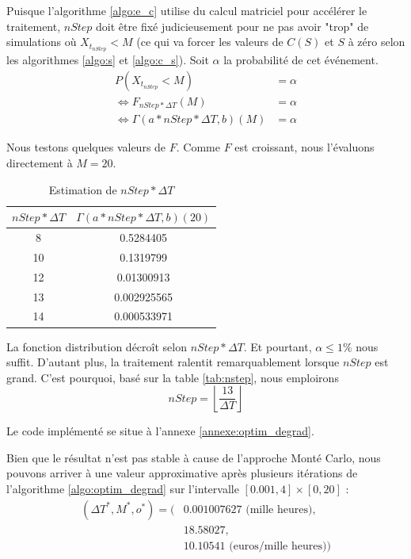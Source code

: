 \documentclass[10pt,a4paper]{article}
\begin{document}
\FloatBarrier
Puisque l'algorithme \eqref{algo:e_c} utilise du calcul matriciel pour accélérer le traitement, $nStep$ doit être fixé judicieusement pour ne pas avoir "trop" de simulations où $X_{t_{nStep}} < M$ (ce qui va forcer les valeurs de $C(S)$ et $S$ à zéro selon les algorithmes \eqref{algo:s} et \eqref{algo:c_s}). Soit $\alpha$ la probabilité de cet événement.
\begin{align*}
    P\left( {{X_{{t_{nStep}}}} < M} \right) & = \alpha  \\
    \Leftrightarrow {F_{nStep*\Delta T}}\left( M \right) & = \alpha \\
    \Leftrightarrow \Gamma \left( {a*nStep*\Delta T,b} \right)\left( M \right) & = \alpha 
\end{align*}

Nous testons quelques valeurs de $F$. Comme $F$ est croissant, nous l'évaluons directement à $M=20$.

\begin{table}[!h]
    \centering
    \begin{tabular}{|c|c|}
      \hline
      $nStep * \Delta T$ &  $\Gamma \left( {a*nStep*\Delta T,b} \right)\left( 20 \right)$\\
      \hline
      8 & 0.5284405 \\
      10 & 0.1319799 \\
      12 & 0.01300913 \\
      13 & 0.002925565 \\
      14 & 0.000533971 \\
      \hline
    \end{tabular}
    \caption{Estimation de $nStep * \Delta T$}
    \label{tab:nstep}
\end{table}

La fonction distribution décroît selon $nStep*\Delta T$. Et pourtant, $\alpha \leq 1\%$ nous suffit. D'autant plus, la traitement ralentit remarquablement lorsque $nStep$ est grand. C'est pourquoi, basé sur la table \eqref{tab:nstep}, nous emploirons
\[nStep = \left\lfloor {\frac{{13}}{{\Delta T}}} \right\rfloor \]

Le code implémenté se situe à l'annexe \ref{annexe:optim_degrad}. 

Bien que le résultat n'est pas stable à cause de l'approche Monté Carlo, nous pouvons arriver à une valeur approximative après plusieurs itérations de l'algorithme \eqref{algo:optim_degrad} sur l'intervalle $[0.001, 4] \times [0, 20]$ : 
\begin{align*}
    (\Delta T^*, M^*, o^*) = (& 0.001007627 \text{ (mille heures)},\\
    & 18.58027,\\
    & 10.10541 \text{ (euros/mille heures)})
\end{align*}
\end{document}
